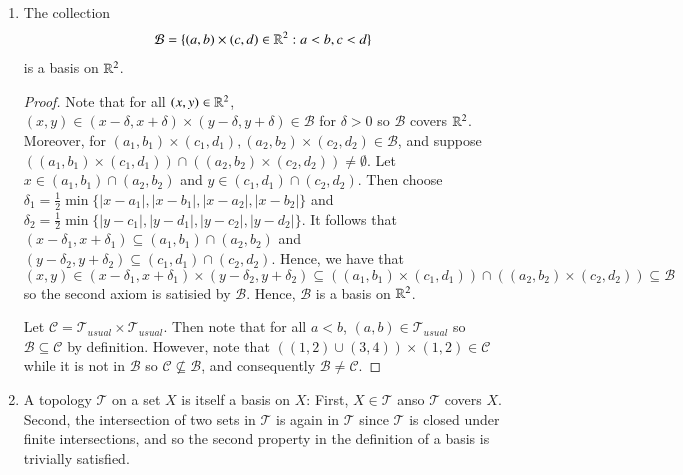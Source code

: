 \documentclass[12pt, a4paper, oneside, openright, titlepage]{book}
\begin{document}
\begin{eg}
\begin{enumerate}
\begin{proof}
            \end{proof}
        \item The collection \begin{equation*}
                \mathcal{B} = \{(a,b)\times (c,d) \in \mathbb R^2: a < b, c < d\}
        \end{equation*}
            is a basis on $\mathbb R^2$.
            \begin{proof}
                Note that for all $(x,y) \in \mathbb R^2$, $(x,y) \in (x-\delta,x+\delta)\times (y-\delta,y+\delta) \in \mathcal{B}$ for $\delta > 0$ so $\mathcal{B}$ covers $\mathbb R^2$. Moreover, for $(a_1,b_1)\times (c_1,d_1),(a_2,b_2)\times(c_2,d_2) \in \mathcal{B}$, and suppose $((a_1,b_1)\times(c_1,d_1))\cap((a_2,b_2)\times(c_2,d_2)) \neq \emptyset$. Let $x \in (a_1,b_1) \cap(a_2,b_2)$ and $y \in (c_1,d_1)\cap(c_2,d_2)$. Then choose $\delta_1 = \frac{1}{2}\min\{|x-a_1|,|x-b_1|,|x-a_2|,|x-b_2|\}$ and $\delta_2 = \frac{1}{2}\min\{|y-c_1|,|y-d_1|,|y-c_2|,|y-d_2|\}$. It follows that $(x-\delta_1,x+\delta_1) \subseteq (a_1,b_1)\cap(a_2,b_2)$ and $(y-\delta_2,y+\delta_2)\subseteq (c_1,d_1)\cap(c_2,d_2)$. Hence, we have that $$(x,y) \in (x-\delta_1,x+\delta_1)\times(y-\delta_2,y+\delta_2) \subseteq ((a_1,b_1)\times(c_1,d_1))\cap((a_2,b_2)\times(c_2,d_2)) \subseteq \mathcal{B}$$ so the second axiom is satisied by $\mathcal{B}$. Hence, $\mathcal{B}$ is a basis on $\mathbb R^2$. 

                Let $\mathcal{C} = \mathcal{T}_{usual}\times\mathcal{T}_{usual}$. Then note that for all $a < b$, $(a,b) \in \mathcal{T}_{usual}$ so $\mathcal{B} \subseteq \mathcal{C}$ by definition. However, note that $((1,2)\cup(3,4)) \times (1,2) \in \mathcal{C}$ while it is not in $\mathcal{B}$ so $\mathcal{C} \nsubseteq \mathcal{B}$, and consequently $\mathcal{B} \neq \mathcal{C}$.
            \end{proof}
            \item A topology $\mathcal{T}$ on a set $X$ is itself a basis on $X$: First, $X \in \mathcal{T}$ anso $\mathcal{T}$ covers $X$. Second, the intersection of two sets in $\mathcal{T}$ is again in $\mathcal{T}$ since $\mathcal{T}$ is closed under finite intersections, and so the second property in the definition of a basis is trivially satisfied. 
    \end{enumerate}
\end{eg}
\end{document}
